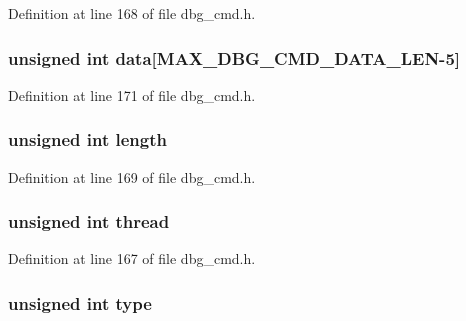 Definition at line 168 of file dbg\-\_\-cmd.\-h.

\hypertarget{structdbg__cmd__type__add__break_ab91dff01c2f12e354ddb4becbe93f063}{
\subsubsection[{data}]{\setlength{\rightskip}{0pt plus 5cm}unsigned int data\mbox{[}{\bf M\-A\-X\-\_\-\-D\-B\-G\-\_\-\-C\-M\-D\-\_\-\-D\-A\-T\-A\-\_\-\-L\-E\-N}-\/5\mbox{]}}}\label{structdbg__cmd__type__add__break_ab91dff01c2f12e354ddb4becbe93f063}


Definition at line 171 of file dbg\-\_\-cmd.\-h.

\hypertarget{structdbg__cmd__type__add__break_ac8d42bcd4a44e078047ccd7291059238}{
\subsubsection[{length}]{\setlength{\rightskip}{0pt plus 5cm}unsigned int length}}\label{structdbg__cmd__type__add__break_ac8d42bcd4a44e078047ccd7291059238}


Definition at line 169 of file dbg\-\_\-cmd.\-h.

\hypertarget{structdbg__cmd__type__add__break_a13f572e7828e1694c6f9c9c78bf7d8f5}{
\subsubsection[{thread}]{\setlength{\rightskip}{0pt plus 5cm}unsigned int thread}}\label{structdbg__cmd__type__add__break_a13f572e7828e1694c6f9c9c78bf7d8f5}


Definition at line 167 of file dbg\-\_\-cmd.\-h.

\hypertarget{structdbg__cmd__type__add__break_a4bfea42429249a1f65204f0c0f34704a}{
\subsubsection[{type}]{\setlength{\rightskip}{0pt plus 5cm}unsigned int type}}\label{structdbg__cmd__type__add__break_a4bfea42429249a1f65204f0c0f34704a}


